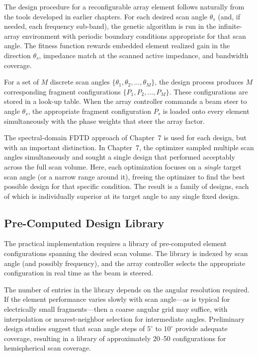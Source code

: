 The design procedure for a reconfigurable array element follows naturally from the tools developed in earlier chapters.  For each desired scan angle $\theta_s$ (and, if needed, each frequency sub-band), the genetic algorithm is run in the infinite-array environment with periodic boundary conditions appropriate for that scan angle.  The fitness function rewards embedded element realized gain in the direction $\theta_s$, impedance match at the scanned active impedance, and bandwidth coverage.

For a set of $M$ discrete scan angles $\{\theta_1, \theta_2, \ldots, \theta_M\}$, the design process produces $M$ corresponding fragment configurations $\{P_1, P_2, \ldots, P_M\}$.  These configurations are stored in a look-up table.  When the array controller commands a beam steer to angle $\theta_s$, the appropriate fragment configuration $P_s$ is loaded onto every element simultaneously with the phase weights that steer the array factor.

The spectral-domain FDTD approach of Chapter~7 is used for each design, but with an important distinction.  In Chapter~7, the optimizer sampled multiple scan angles simultaneously and sought a single design that performed acceptably across the full scan volume.  Here, each optimization focuses on a \emph{single} target scan angle (or a narrow range around it), freeing the optimizer to find the best possible design for that specific condition.  The result is a family of designs, each of which is individually superior at its target angle to any single fixed design.

\subsection{Pre-Computed Design Library}

The practical implementation requires a library of pre-computed element configurations spanning the desired scan volume.  The library is indexed by scan angle (and possibly frequency), and the array controller selects the appropriate configuration in real time as the beam is steered.

The number of entries in the library depends on the angular resolution required.  If the element performance varies slowly with scan angle---as is typical for electrically small fragments---then a coarse angular grid may suffice, with interpolation or nearest-neighbor selection for intermediate angles.  Preliminary design studies suggest that scan angle steps of $5^{\circ}$ to $10^{\circ}$ provide adequate coverage, resulting in a library of approximately 20--50 configurations for hemispherical scan coverage.

